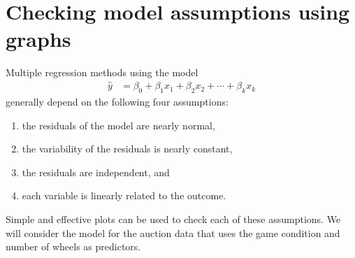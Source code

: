 \section{Checking model assumptions using graphs}
\label{multipleRegressionModelAssumptions}


Multiple regression methods using the model
\begin{align*}
\hat{y} &= \beta_0 + \beta_1x_1 + \beta_2x_2 + \cdots + \beta_kx_k
\end{align*}
generally depend on the following four assumptions:
\begin{enumerate}
\setlength{\itemsep}{0mm}
\item the residuals of the model are nearly normal,
\item the variability of the residuals is nearly constant,
\item the residuals are independent, and
\item each variable is linearly related to the outcome.
\end{enumerate}
Simple and effective plots can be used to check each of these assumptions. We will consider the model for the auction data that uses the game condition and number of wheels as predictors.

\textB{\pagebreak}

